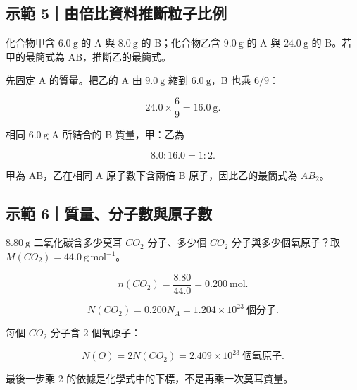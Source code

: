 \documentclass[11pt,a4paper]{article}
\begin{document}
\begin{HandoutWorkedExample}

\subsection{示範 5｜由倍比資料推斷粒子比例}\label{ux793aux7bc4-5ux7531ux500dux6bd4ux8cc7ux6599ux63a8ux65b7ux7c92ux5b50ux6bd4ux4f8b}

化合物甲含 \(6.0\ \mathrm g\) 的 A 與 \(8.0\ \mathrm g\) 的 B；化合物乙含 \(9.0\ \mathrm g\) 的 A 與 \(24.0\ \mathrm g\) 的 B。若甲的最簡式為 AB，推斷乙的最簡式。

先固定 A 的質量。把乙的 A 由 \(9.0\ \mathrm g\) 縮到 \(6.0\ \mathrm g\)，B 也乘 \(6/9\)：

\[
24.0\times\frac69=16.0\ \mathrm g.
\]

相同 \(6.0\ \mathrm g\) A 所結合的 B 質量，甲：乙為

\[
8.0:16.0=1:2.
\]

甲為 AB，乙在相同 A 原子數下含兩倍 B 原子，因此乙的最簡式為 \(AB_2\)。

\end{HandoutWorkedExample}

\begin{HandoutWorkedExample}

\subsection{示範 6｜質量、分子數與原子數}\label{ux793aux7bc4-6ux8ceaux91cfux5206ux5b50ux6578ux8207ux539fux5b50ux6578}

\(8.80\ \mathrm g\) 二氧化碳含多少莫耳 \(CO_2\) 分子、多少個 \(CO_2\) 分子與多少個氧原子？取 \(M(CO_2)=44.0\ \mathrm{g\,mol^{-1}}\)。

\[
n(CO_2)=\frac{8.80}{44.0}=0.200\ \mathrm{mol}.
\]

\[
N(CO_2)=0.200N_A=1.204\times10^{23}\ \text{個分子}.
\]

每個 \(CO_2\) 分子含 2 個氧原子：

\[
N(O)=2N(CO_2)=2.409\times10^{23}\ \text{個氧原子}.
\]

最後一步乘 2 的依據是化學式中的下標，不是再乘一次莫耳質量。

\end{HandoutWorkedExample}
\end{document}
